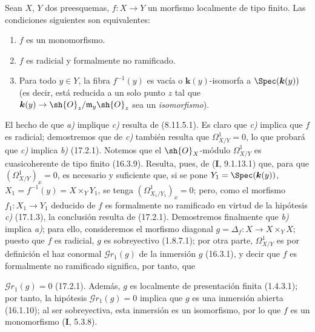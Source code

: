 \begin{proposition}[17.2.6]
\label{IV.17.2.6}
Sean $X$, $Y$ dos preesquemas, $f:X\to Y$ un morfismo localmente de tipo finito. Las condiciones siguientes son equivalentes:
\begin{enumerate}
  \item[\textup{a)}] $f$ es un monomorfismo.
  \item[\textup{b)}] $f$ es radicial y formalmente no ramificado.
  \item[\textup{c)}] Para todo $y\in Y$, la fibra $f^{-1}(y)$ es vacía o $\boldsymbol{k}(y)$-isomorfa a $\Spec(\boldsymbol{k}(y))$ \textup{(es decir, está reducida a un solo punto $z$ tal que} $\boldsymbol{k}(y)\to\sh{O}_z/\mathfrak{m}_y\sh{O}_z$ \textup{sea un \emph{isomorfismo})}.
\end{enumerate}
\end{proposition}

El hecho de que \emph{a)} implique \emph{c)} resulta de (8.11.5.1). Es claro que \emph{c)} implica que $f$ es radicial; demostremos que de \emph{c)} también resulta que $\varOmega_{X/Y}^1=0$, lo que probará que \emph{c)} implica \emph{b)} (17.2.1). Notemos que el $\sh{O}_X$-módulo $\varOmega_{X/Y}^1$ es cuasicoherente de tipo finito (16.3.9). Resulta, pues, de (\textbf I, 9.1.13.1) que, para que $(\varOmega_{X/Y}^1)_x=0$, es necesario y suficiente que, si se pone $Y_1=\Spec(\boldsymbol{k}(y))$, $X_1=f^{-1}(y)=X\times_Y Y_1$, se tenga $(\varOmega_{X_1/Y_1}^1)_x=0$; pero, como el morfismo $f_1:X_1\to Y_1$ deducido de $f$ es formalmente no ramificado en virtud de la hipótesis \emph{c)} (17.1.3), la conclusión resulta de (17.2.1). Demostremos finalmente que \emph{b)} implica \emph{a)}; para ello, consideremos el morfismo diagonal $g=\Delta_f:X\to X\times_Y X$; puesto que $f$ es radicial, $g$ es sobreyectivo (1.8.7.1); por otra parte, $\varOmega_{X/Y}^1$ es por definición el haz conormal $\mathscr{G}r_1(g)$ de la inmersión $g$ (16.3.1), y decir que $f$ es formalmente no ramificado significa, por tanto, que

$\mathscr{G}r_1(g)=0$ (17.2.1). Además, $g$ es localmente de presentación finita (1.4.3.1); por tanto, la hipótesis $\mathscr{G}r_1(g)=0$ implica que $g$ es una inmersión abierta (16.1.10); al ser sobreyectiva, esta inmersión es un isomorfismo, por lo que $f$ es un monomorfismo (\textbf I, 5.3.8).
